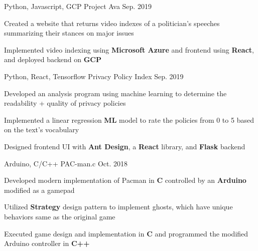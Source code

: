 

\begin{cventries}

  \cventry
    {Python, Javascript, GCP} %
    {Project Ava}
    {Sep. 2019}
    {} %
    {
      \begin{cvitems} %
        \item {Created a website that returns video indexes of a politician's speeches summarizing their stances on major issues}
        \item {Implemented video indexing using \textbf{Microsoft Azure} and frontend using \textbf{React}, and deployed backend on \textbf{GCP}}
      \end{cvitems}
    }

  \cventry
    {Python, React, Tensorflow} %
    {Privacy Policy Index}
    {Sep. 2019}
    {} %
    {
      \begin{cvitems} %
        \item {Developed an analysis program using machine learning to determine the readability + quality of privacy policies}
        \item {Implemented a linear regression \textbf{ML} model to rate the policies from 0 to 5 based on the text's vocabulary}
        \item {Designed frontend UI with \textbf{Ant Design}, a \textbf{React} library, and \textbf{Flask} backend}
      \end{cvitems}
    }

  \cventry
  {Arduino, C/C++} %
  {PAC-man.c} %
  {Oct. 2018}
  {}
  {
    \begin{cvitems} %
      \item {Developed modern implementation of Pacman in \textbf{C} controlled by an \textbf{Arduino} modified as a gamepad}
      \item {Utilized \textbf{Strategy} design pattern to implement ghosts, which have unique behaviors same as the original game}
      \item {Executed game design and implementation in \textbf{C} and programmed the modified Arduino controller in \textbf{C++}}
    \end{cvitems}
  }


\end{cventries}
